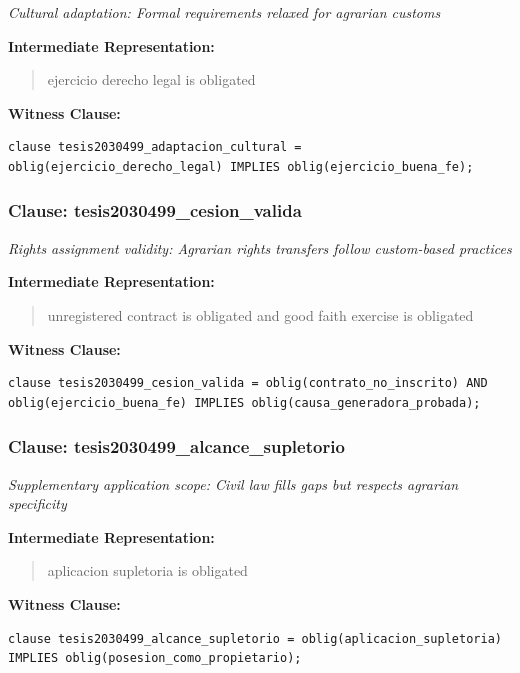 \documentclass[11pt,a4paper]{article}
\begin{document}
\textit{Cultural adaptation: Formal requirements relaxed for agrarian customs}

\textbf{Intermediate Representation:}

\begin{quote}
ejercicio derecho legal is obligated
\end{quote}

\textbf{Witness Clause:}

\begin{lstlisting}[style=witnessstyle, language=Witness]
clause tesis2030499_adaptacion_cultural = oblig(ejercicio_derecho_legal) IMPLIES oblig(ejercicio_buena_fe);
\end{lstlisting}

\subsubsection{Clause: tesis2030499\_cesion\_valida}

\textit{Rights assignment validity: Agrarian rights transfers follow custom-based practices}

\textbf{Intermediate Representation:}

\begin{quote}
unregistered contract is obligated and good faith exercise is obligated
\end{quote}

\textbf{Witness Clause:}

\begin{lstlisting}[style=witnessstyle, language=Witness]
clause tesis2030499_cesion_valida = oblig(contrato_no_inscrito) AND oblig(ejercicio_buena_fe) IMPLIES oblig(causa_generadora_probada);
\end{lstlisting}

\subsubsection{Clause: tesis2030499\_alcance\_supletorio}

\textit{Supplementary application scope: Civil law fills gaps but respects agrarian specificity}

\textbf{Intermediate Representation:}

\begin{quote}
aplicacion supletoria is obligated
\end{quote}

\textbf{Witness Clause:}

\begin{lstlisting}[style=witnessstyle, language=Witness]
clause tesis2030499_alcance_supletorio = oblig(aplicacion_supletoria) IMPLIES oblig(posesion_como_propietario);
\end{lstlisting}
\end{document}
